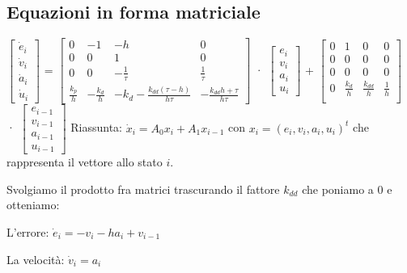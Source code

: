 \subsection{Equazioni in forma matriciale}
$\begin{bmatrix}
    \Dot{e}_i \\
    \Dot{v}_i \\
    \Dot{a}_i \\
    \Dot{u}_i
\end{bmatrix}$ = 
$\begin{bmatrix}
    0 & -1 & -h & 0 \\
    0 & 0 & 1 & 0 \\
    0 & 0 & -\frac{1}{\tau} & \frac{1}{\tau} \\
    \frac{k_p}{h} & -\frac{k_d}{h} & -k_d-\frac{k_{dd}(\tau-h)}{h\tau} & -\frac{k_{dd}h+\tau}{h\tau}
\end{bmatrix}$ · 
$\begin{bmatrix}
    e_i \\
    v_i \\
    a_i \\
    u_i
\end{bmatrix}$ +
$\begin{bmatrix}
    0 & 1 & 0 & 0 \\
    0 & 0 & 0 & 0 \\
    0 & 0 & 0 & 0 \\
    0 & \frac{k_d}{h} & \frac{k_{dd}}{h} & \frac{1}{h} \\
\end{bmatrix}$ · 
$\begin{bmatrix}
    e_{i-1} \\
    v_{i-1} \\
    a_{i-1} \\
    u_{i-1}
\end{bmatrix}$
\newline
\newline
Riassunta: $\Dot{x}_i = A_0x_i + A_1x_{i-1}$
con $x_i = (e_i, v_i, a_i, u_i)^t$ che rappresenta il vettore allo stato $i$.

\noindent Svolgiamo il prodotto fra matrici trascurando il fattore $k_{dd}$ che poniamo a $0$ e otteniamo:
\newline

\noindent L'errore: \(\Dot{e}_i = -v_i - ha_i + v_{i-1}\)
\newline

\noindent La velocità: \(\Dot{v}_i = a_i\)
\newline

